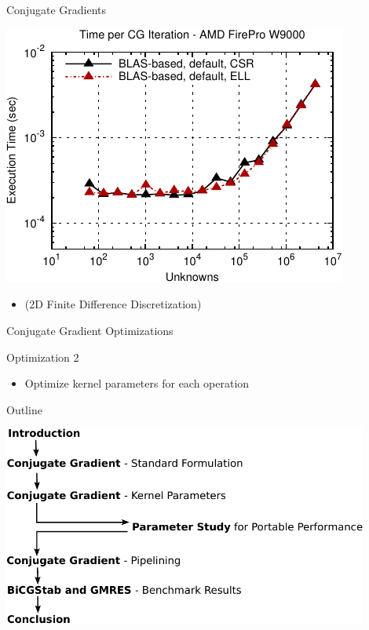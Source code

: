 \begin{frame}[fragile]{Conjugate Gradients}
 \begin{block}{}
 \begin{center}
  \vspace*{-0.5cm}
  \includegraphics[width=0.85\textwidth]{figures/cg-firepro-w9000-1}
 \end{center}

 \begin{itemize}
  \item   \vspace*{-0.3cm} {\small (2D Finite Difference Discretization)}
 \end{itemize}
 \end{block}   
\end{frame}


\begin{frame}[fragile]{Conjugate Gradient Optimizations}

 \begin{block}{Optimization 2}
   \begin{itemize}
   \item Optimize kernel parameters for each operation
  \end{itemize}
 \end{block}
   
\end{frame}


\begin{frame}{Outline}
 \begin{center}
  \includegraphics[width=0.9\textwidth]{figures/outline-crop}
 \end{center}
\end{frame}
